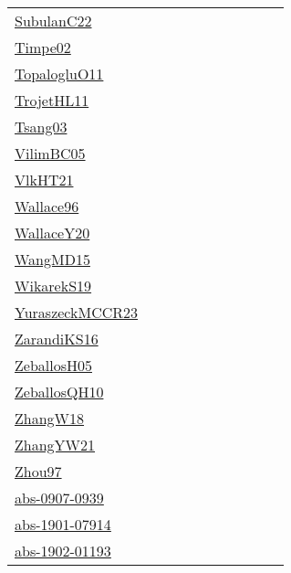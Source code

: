 {\begin{longtable}{p{3cm}p{4cm}p{2cm}p{2cm}p{2cm}p{2cm}p{2cm}p{2cm}p{2cm}p{2cm}}
\href{articles/SubulanC22.pdf}{SubulanC22}~\cite{SubulanC22} &  &  &  &  &  &  &  &  & \\
\href{articles/Timpe02.pdf}{Timpe02}~\cite{Timpe02} &  &  &  &  &  &  &  &  & \\
\href{articles/TopalogluO11.pdf}{TopalogluO11}~\cite{TopalogluO11} &  &  &  &  &  &  &  &  & \\
\href{articles/TrojetHL11.pdf}{TrojetHL11}~\cite{TrojetHL11} &  &  &  &  &  &  &  &  & \\
\href{articles/Tsang03.pdf}{Tsang03}~\cite{Tsang03} &  &  &  &  &  &  &  &  & \\
\href{articles/VilimBC05.pdf}{VilimBC05}~\cite{VilimBC05} &  &  &  &  &  &  &  &  & \\
\href{articles/VlkHT21.pdf}{VlkHT21}~\cite{VlkHT21} &  &  &  &  &  &  &  &  & \\
\href{articles/Wallace96.pdf}{Wallace96}~\cite{Wallace96} &  &  &  &  &  &  &  &  & \\
\href{articles/WallaceY20.pdf}{WallaceY20}~\cite{WallaceY20} &  &  &  &  &  &  &  &  & \\
\href{articles/WangMD15.pdf}{WangMD15}~\cite{WangMD15} &  &  &  &  &  &  &  &  & \\
\href{articles/WikarekS19.pdf}{WikarekS19}~\cite{WikarekS19} &  &  &  &  &  &  &  &  & \\
\href{articles/YuraszeckMCCR23.pdf}{YuraszeckMCCR23}~\cite{YuraszeckMCCR23} &  &  &  &  &  &  &  &  & \\
\href{articles/ZarandiKS16.pdf}{ZarandiKS16}~\cite{ZarandiKS16} &  &  &  &  &  &  &  &  & \\
\href{articles/ZeballosH05.pdf}{ZeballosH05}~\cite{ZeballosH05} &  &  &  &  &  &  &  &  & \\
\href{articles/ZeballosQH10.pdf}{ZeballosQH10}~\cite{ZeballosQH10} &  &  &  &  &  &  &  &  & \\
\href{articles/ZhangW18.pdf}{ZhangW18}~\cite{ZhangW18} &  &  &  &  &  &  &  &  & \\
\href{articles/ZhangYW21.pdf}{ZhangYW21}~\cite{ZhangYW21} &  &  &  &  &  &  &  &  & \\
\href{articles/Zhou97.pdf}{Zhou97}~\cite{Zhou97} &  &  &  &  &  &  &  &  & \\
\href{articles/abs-0907-0939.pdf}{abs-0907-0939}~\cite{abs-0907-0939} &  &  &  &  &  &  &  &  & \\
\href{articles/abs-1901-07914.pdf}{abs-1901-07914}~\cite{abs-1901-07914} &  &  &  &  &  &  &  &  & \\
\href{articles/abs-1902-01193.pdf}{abs-1902-01193}~\cite{abs-1902-01193} &  &  &  &  &  &  &  &  & \\

\end{longtable}}
